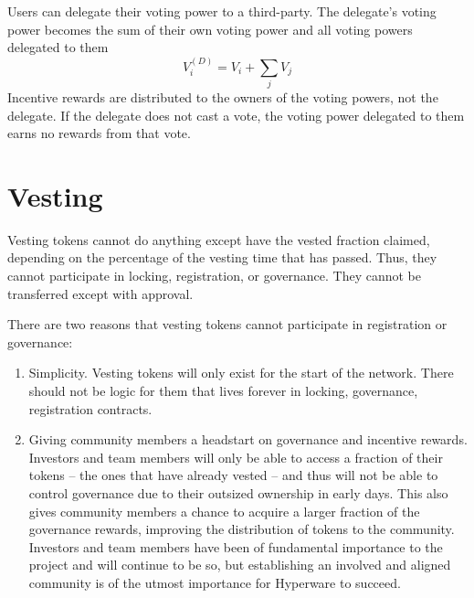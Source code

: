 \documentclass{article}
\begin{document}
Users can delegate their voting power to a third-party.
The delegate's voting power becomes the sum of their own voting power and all voting powers delegated to them
\begin{equation}
V^{(D)}_i = V_i + \sum_j V_j
\end{equation}
Incentive rewards are distributed to the owners of the voting powers, not the delegate.
If the delegate does not cast a vote, the voting power delegated to them earns no rewards from that vote.

\section{Vesting}\label{sec:vesting}

Vesting tokens cannot do anything except have the vested fraction claimed, depending on the percentage of the vesting time that has passed.
Thus, they cannot participate in locking, registration, or governance.
They cannot be transferred except with approval.

There are two reasons that vesting tokens cannot participate in registration or governance:
\begin{enumerate}
    \item Simplicity.
         Vesting tokens will only exist for the start of the network.
         There should not be logic for them that lives forever in locking, governance, registration contracts.
    \item Giving community members a headstart on governance and incentive rewards.
         Investors and team members will only be able to access a fraction of their tokens -- the ones that have already vested -- and thus will not be able to control governance due to their outsized ownership in early days.
         This also gives community members a chance to acquire a larger fraction of the governance rewards, improving the distribution of tokens to the community.
         Investors and team members have been of fundamental importance to the project and will continue to be so, but establishing an involved and aligned community is of the utmost importance for Hyperware to succeed.
\end{enumerate}
\end{document}
